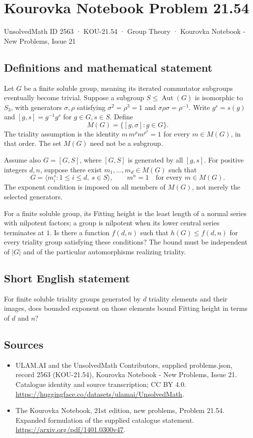 \documentclass[11pt,a4paper]{article}
\begin{document}
\section*{Kourovka Notebook Problem 21.54}\label{2563}
{\small UnsolvedMath ID 2563 · KOU-21.54 · Group Theory · Kourovka Notebook - New Problems, Issue 21}
\subsection{Definitions and mathematical statement}
Let $G$ be a finite soluble group, meaning its iterated commutator
subgroups eventually become trivial. Suppose a subgroup
$S\le\operatorname{Aut}(G)$ is isomorphic to $S_3$, with generators
$\sigma,\rho$ satisfying $\sigma^2=\rho^3=1$ and
$\sigma\rho\sigma=\rho^{-1}$. Write $g^s=s(g)$ and
$[g,s]=g^{-1}g^s$ for $g\in G,s\in S$.
Define
\[
 M(G)=\{[g,\sigma]:g\in G\}.
\]
The triality assumption is the identity
$m\,m^\rho m^{\rho^2}=1$ for every $m\in M(G)$, in that order.
The set $M(G)$ need not be a subgroup.

Assume also $G=[G,S]$, where $[G,S]$ is generated by all $[g,s]$.
For positive integers $d,n$, suppose there exist
$m_1,\ldots,m_d\in M(G)$ such that
\[
 G=\langle m_i^s:1\le i\le d,\ s\in S\rangle,
 \qquad m^n=1\quad\text{for every }m\in M(G).
\]
The exponent condition is imposed on all members of $M(G)$, not merely
the selected generators.

For a finite soluble group, its Fitting height is the least length
of a normal series with nilpotent factors; a group is nilpotent when
its lower central series terminates at $1$.
Is there a function $f(d,n)$ such that $h(G)\le f(d,n)$ for every
triality group satisfying these conditions? The bound must be independent
of $|G|$ and of the particular automorphisms realizing triality.
\subsection{Short English statement}
For finite soluble triality groups generated by $d$ triality elements and their images, does bounded exponent on those elements bound Fitting height in terms of $d$ and $n$?
\subsection{Sources}
\begin{itemize}
\item[S1] ULAM.AI and the UnsolvedMath Contributors, supplied problems.json, record 2563 (KOU-21.54), Kourovka Notebook - New Problems, Issue 21. Catalogue identity and source transcription; CC BY 4.0.
\url{https://huggingface.co/datasets/ulamai/UnsolvedMath}.
\item[S2] The Kourovka Notebook, 21st edition, new problems, Problem 21.54. Expanded formulation of the supplied catalogue statement.
\url{https://arxiv.org/pdf/1401.0300v47}.
\end{itemize}
\end{document}
